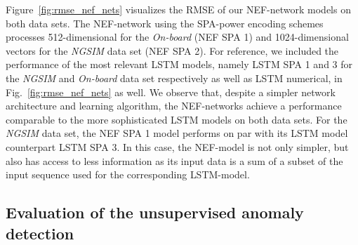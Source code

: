 Figure~\ref{fig:rmse_nef_nets} visualizes the \ac{RMSE} of our \ac{NEF}-network models on both data sets.
The \ac{NEF}-network using the \ac{SPA}-power encoding schemes processes \num{512}-dimensional for the \emph{On-board} (\ac{NEF} \ac{SPA} \num{1}) and \num{1024}-dimensional vectors for the \emph{\ac{NGSIM}} data set (\ac{NEF} \ac{SPA} \num{2}).
For reference, we included the performance of the most relevant \ac{LSTM} models, namely \ac{LSTM} \ac{SPA} \num{1} and \num{3} for the \emph{\ac{NGSIM}} and \emph{On-board} data set respectively as well as \ac{LSTM} numerical, in Fig.~\ref{fig:rmse_nef_nets} as well.
We observe that, despite a simpler network architecture and learning algorithm, the \ac{NEF}-networks achieve a performance comparable to the more sophisticated \ac{LSTM} models on both data sets.
For the \emph{\ac{NGSIM}} data set, the \ac{NEF} \ac{SPA} \num{1} model performs on par with its \ac{LSTM} model counterpart \ac{LSTM} \ac{SPA} \num{3}.
In this case, the \ac{NEF}-model is not only simpler, but also has access to less information as its input data is a sum of a subset of the input sequence used for the corresponding \ac{LSTM}-model.

\subsection{Evaluation of the unsupervised anomaly detection}%
\label{subsec:evaluation_of_the_unsupervised_anomaly_detection}

